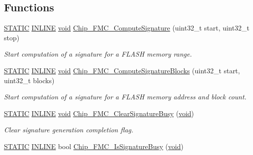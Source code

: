 \subsection*{Functions}
\begin{DoxyCompactItemize}
\item 
\hyperlink{group__LPC__Types__Public__Macros_ga10b2d890d871e1489bb02b7e70d9bdfb}{S\-T\-A\-T\-I\-C} \hyperlink{group__LPC__Types__Public__Types_ga2eb6f9e0395b47b8d5e3eeae4fe0c116}{I\-N\-L\-I\-N\-E} \hyperlink{Paradigm_2Tern__EE_2small_2portmacro_8h_a14d32f8130d3c0b212cfc751730b5b49}{void} \hyperlink{group__FMC__17XX__40XX_ga12cde229d831a9e32208b038651ca228}{Chip\-\_\-\-F\-M\-C\-\_\-\-Compute\-Signature} (uint32\-\_\-t start, uint32\-\_\-t stop)
\begin{DoxyCompactList}\small\item\em Start computation of a signature for a F\-L\-A\-S\-H memory range. \end{DoxyCompactList}\item 
\hyperlink{group__LPC__Types__Public__Macros_ga10b2d890d871e1489bb02b7e70d9bdfb}{S\-T\-A\-T\-I\-C} \hyperlink{group__LPC__Types__Public__Types_ga2eb6f9e0395b47b8d5e3eeae4fe0c116}{I\-N\-L\-I\-N\-E} \hyperlink{Paradigm_2Tern__EE_2small_2portmacro_8h_a14d32f8130d3c0b212cfc751730b5b49}{void} \hyperlink{group__FMC__17XX__40XX_ga1341098e386d4291bf7ad3fb43b6d3bc}{Chip\-\_\-\-F\-M\-C\-\_\-\-Compute\-Signature\-Blocks} (uint32\-\_\-t start, uint32\-\_\-t blocks)
\begin{DoxyCompactList}\small\item\em Start computation of a signature for a F\-L\-A\-S\-H memory address and block count. \end{DoxyCompactList}\item 
\hyperlink{group__LPC__Types__Public__Macros_ga10b2d890d871e1489bb02b7e70d9bdfb}{S\-T\-A\-T\-I\-C} \hyperlink{group__LPC__Types__Public__Types_ga2eb6f9e0395b47b8d5e3eeae4fe0c116}{I\-N\-L\-I\-N\-E} \hyperlink{Paradigm_2Tern__EE_2small_2portmacro_8h_a14d32f8130d3c0b212cfc751730b5b49}{void} \hyperlink{group__FMC__17XX__40XX_gab7ec5bd928d355795e7cd4f56371a9ec}{Chip\-\_\-\-F\-M\-C\-\_\-\-Clear\-Signature\-Busy} (\hyperlink{Paradigm_2Tern__EE_2small_2portmacro_8h_a14d32f8130d3c0b212cfc751730b5b49}{void})
\begin{DoxyCompactList}\small\item\em Clear signature generation completion flag. \end{DoxyCompactList}\item 
\hyperlink{group__LPC__Types__Public__Macros_ga10b2d890d871e1489bb02b7e70d9bdfb}{S\-T\-A\-T\-I\-C} \hyperlink{group__LPC__Types__Public__Types_ga2eb6f9e0395b47b8d5e3eeae4fe0c116}{I\-N\-L\-I\-N\-E} bool \hyperlink{group__FMC__17XX__40XX_gaf2d1ec53b9f1e3e79cd6e9389597220d}{Chip\-\_\-\-F\-M\-C\-\_\-\-Is\-Signature\-Busy} (\hyperlink{Paradigm_2Tern__EE_2small_2portmacro_8h_a14d32f8130d3c0b212cfc751730b5b49}{void})

\end{DoxyCompactItemize}
